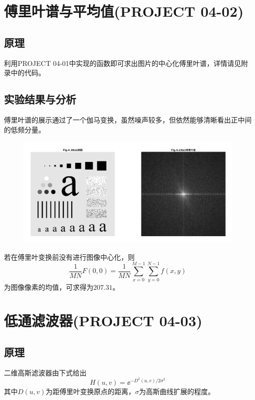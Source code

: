 \documentclass[logo,reportComp]{thesis}
\begin{document}
\section{傅里叶谱与平均值(PROJECT 04-02)}
\subsection{原理}
利用PROJECT 04-01中实现的函数即可求出图片的中心化傅里叶谱，详情请见附录中的代码。

\subsection{实验结果与分析}
傅里叶谱的展示通过了一个伽马变换，虽然噪声较多，但依然能够清晰看出正中间的低频分量。
\begin{figure}[H]
\centering
\includegraphics[width=0.8\linewidth]{fig/01.png}
\end{figure}

若在傅里叶变换前没有进行图像中心化，则
\[\frac{1}{MN}F(0,0)=\frac{1}{MN}\sum_{x=0}^{M-1}\sum_{y=0}^{N-1}f(x,y)\]
为图像像素的均值，可求得为$207.31$。

\section{低通滤波器(PROJECT 04-03)}
\subsection{原理}
二维高斯滤波器由下式给出
\[H(u,v)=\ee^{-D^2(u,v)/2\sigma^2}\]
其中$D(u,v)$为距傅里叶变换原点的距离，$\sigma$为高斯曲线扩展的程度。
\end{document}
